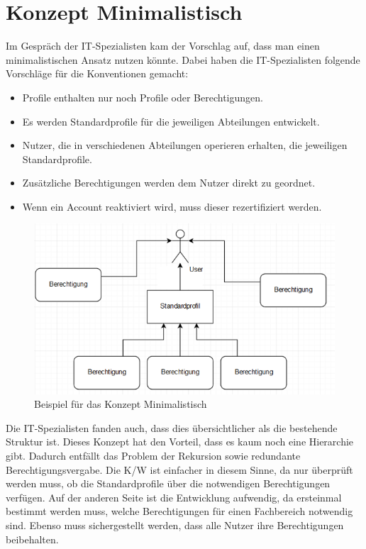 \section{Konzept Minimalistisch}
\label{sec:chapter04:minimal}
Im Gespräch der IT-Spezialisten kam der Vorschlag auf, dass man einen minimalistischen Ansatz nutzen könnte.
Dabei haben die IT-Spezialisten folgende Vorschläge für die Konventionen gemacht:
\newline
\begin{itemize}
	\item Profile enthalten nur noch Profile oder Berechtigungen.
	\item Es werden Standardprofile für die jeweiligen Abteilungen entwickelt.
	\item Nutzer, die in verschiedenen Abteilungen operieren erhalten, die jeweiligen Standardprofile.
	\item Zusätzliche Berechtigungen werden dem Nutzer direkt zu geordnet.
	\item Wenn ein Account reaktiviert wird, muss dieser rezertifiziert werden.
\end{itemize}
\begin{figure}[h!]
 \centering
 \includegraphics[width=1\textwidth]{gfx/Picture/Minimal.PNG}
 \caption{Beispiel für das Konzept Minimalistisch}
 \label{fig:Min}
\end{figure}
Die IT-Spezialisten fanden auch, dass dies übersichtlicher als die bestehende Struktur ist.
Dieses Konzept hat den Vorteil, dass es kaum noch eine Hierarchie gibt.
Dadurch entfällt das Problem der Rekursion sowie redundante Berechtigungsvergabe.
Die \ac{K/W} ist einfacher in diesem Sinne, da nur überprüft werden muss, ob die Standardprofile über die notwendigen Berechtigungen verfügen.
Auf der anderen Seite ist die Entwicklung aufwendig, da ersteinmal bestimmt werden muss, welche Berechtigungen für einen Fachbereich notwendig sind. Ebenso muss sichergestellt werden, dass alle Nutzer ihre Berechtigungen beibehalten.
